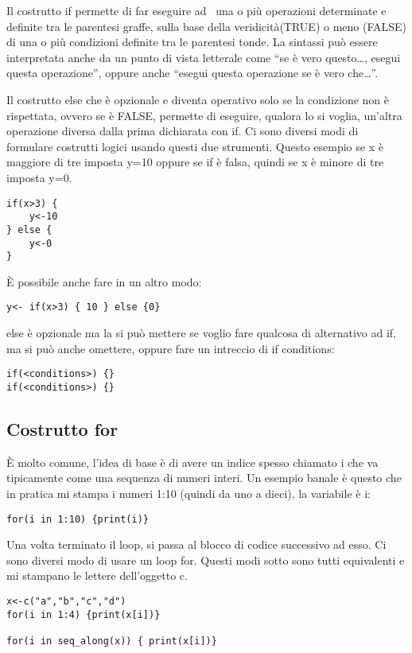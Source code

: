 Il costrutto \textsf{if} permette di far eseguire ad \erre\ una o più operazioni determinate e definite tra le parentesi graffe, sulla base della veridicità(\textsf{TRUE}) o meno (\textsf{FALSE}) di una o più condizioni definite tra le parentesi tonde. La sintassi può essere interpretata anche da un punto di vista letterale come ``se è vero questo\dots, esegui questa operazione'', oppure anche ``esegui questa operazione se è vero che\dots''.

Il costrutto \textsf{else} che è opzionale e diventa operativo solo se la condizione non è rispettata, ovvero se è \textsf{FALSE}, permette di eseguire, qualora lo si voglia, un'altra operazione diversa dalla prima dichiarata con \textsf{if}. Ci sono diversi modi di formulare costrutti logici usando questi due strumenti.
Questo esempio se x è maggiore di tre \erre imposta y=10 oppure se if è falsa,
quindi se x è minore di tre \erre imposta y=0.
\begin{lstlisting}
if(x>3) {
	y<-10
} else {
	y<-0
}
\end{lstlisting}
È possibile anche fare in un altro modo:
\begin{lstlisting}
y<- if(x>3) { 10 } else {0}
\end{lstlisting}

else è opzionale ma la si può mettere se voglio fare qualcosa di alternativo ad if, ma si può anche omettere, oppure fare un intreccio
di if conditions:
\begin{lstlisting}
if(<conditions>) {}
if(<conditions>) {}
\end{lstlisting}

\subsection{Costrutto for}

È molto comune, l'idea di base è di avere un indice spesso chiamato i che va tipicamente
come una sequenza di numeri interi.
Un esempio banale è questo che in pratica mi stampa i numeri 1:10
(quindi da uno a dieci), la variabile è i:

\begin{lstlisting}
for(i in 1:10) {print(i)}
\end{lstlisting}

Una volta terminato il loop, si passa al blocco di codice successivo ad esso.
Ci sono diversi modo di usare un loop for.
Questi modi sotto sono tutti equivalenti e mi stampano le lettere dell'oggetto c.

\begin{lstlisting}
x<-c("a","b","c","d")
for(i in 1:4) {print(x[i])}

for(i in seq_along(x)) { print(x[i])} 
\end{lstlisting}

